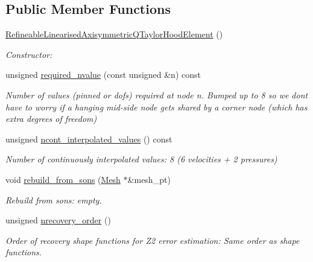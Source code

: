 \subsection*{Public Member Functions}
\begin{DoxyCompactItemize}
\item 
\hyperlink{classoomph_1_1RefineableLinearisedAxisymmetricQTaylorHoodElement_afffa55c36148f65abaaa0682be2f3f7a}{Refineable\+Linearised\+Axisymmetric\+Q\+Taylor\+Hood\+Element} ()
\begin{DoxyCompactList}\small\item\em Constructor\+: \end{DoxyCompactList}\item 
unsigned \hyperlink{classoomph_1_1RefineableLinearisedAxisymmetricQTaylorHoodElement_a689a0ee05599e85b43b2cb484be70309}{required\+\_\+nvalue} (const unsigned \&n) const
\begin{DoxyCompactList}\small\item\em Number of values (pinned or dofs) required at node n. Bumped up to 8 so we don\textquotesingle{}t have to worry if a hanging mid-\/side node gets shared by a corner node (which has extra degrees of freedom) \end{DoxyCompactList}\item 
unsigned \hyperlink{classoomph_1_1RefineableLinearisedAxisymmetricQTaylorHoodElement_add4cd6369630d663d1fce603040ebe72}{ncont\+\_\+interpolated\+\_\+values} () const
\begin{DoxyCompactList}\small\item\em Number of continuously interpolated values\+: 8 (6 velocities + 2 pressures) \end{DoxyCompactList}\item 
void \hyperlink{classoomph_1_1RefineableLinearisedAxisymmetricQTaylorHoodElement_ac24b86ceb9dbb345be509a375617086c}{rebuild\+\_\+from\+\_\+sons} (\hyperlink{classoomph_1_1Mesh}{Mesh} $\ast$\&mesh\+\_\+pt)
\begin{DoxyCompactList}\small\item\em Rebuild from sons\+: empty. \end{DoxyCompactList}\item 
unsigned \hyperlink{classoomph_1_1RefineableLinearisedAxisymmetricQTaylorHoodElement_a404f83f61a4acf243319b2c618024f27}{nrecovery\+\_\+order} ()
\begin{DoxyCompactList}\small\item\em Order of recovery shape functions for Z2 error estimation\+: Same order as shape functions. \end{DoxyCompactList}\item 

\end{DoxyCompactItemize}
